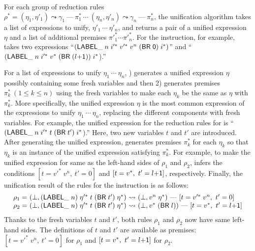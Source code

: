 For each group of reduction rules $\rho^* =
(\eta_1, \eta' _1) \leadsto \gamma_1\ \mbox{---}\ \pi_1^*\
\cdots\
(\eta_n, \eta' _n) \leadsto \gamma_n\ \mbox{---}\ \pi_n^*$,
the unification algorithm \unify takes a list of expressions to unify,
$\eta'_1\ \cdots\ \eta'_n$, and returns a pair of
a unified expression $\eta$ and a list of additional premises $\pi'^*_1 \cdots \pi'^*_n$.
For the \inblue{\ensuremath{\mathsf{br}}} instruction, for example,
\unify takes two expressions
``{$(\mathsf{LABEL\_} \; n \; i'^*\; v'^*\; v^n\; (\mathsf{BR\; 0})\; i^*)$}'' and
``{$(\mathsf{LABEL\_} \; n \; i'^*\; v^*\; (\mathsf{BR\; (} l\mathsf{+1)})\; i^*$)}.''

For a list of expressions to unify $\eta_1\ \cdots\ \eta_n$,
) generates a unified expression $\eta$ possibly containing some fresh variables
and then 2) generates premises $\pi_k^*\ (1\le k \le n)$ using the fresh variables to make
each $\eta_k$ be the same as $\eta$ with $\pi_k^*$.
More specifically, the unified expression $\eta$ is the most common expression of
the expressions to unify $\eta_1\ \cdots\ \eta_n$,
replacing the different components with fresh variables.
For example, the unified expression for the reduction rules for  is
``{$(\mathsf{LABEL\_} \; n \; i'^*\; t\; (\mathsf{BR}\; t')\; i^*$)}.''
Here, two new variables $t$ and $t'$ are introduced.
After generating the unified expression, \unify generates premises $\pi_k^*$
for each $\eta_k$ so that $\eta_k$ is an instance of the unified expression satisfying $\pi_k^*$.
For example, to make the unified expression for 
same as the left-hand sides of $\rho_1$ and $\rho_2$, \unify infers the conditions
$[t = v'^*\; v^n,\ t' = 0]$ and $[t = v^*,\ t' = l\mathsf{+1}]$, respectively.
Finally, the unification result of the rules for the  instruction is as follows:
\[
\begin{array}{l@{~}l@{~}c@{~}l}
\rho_1 = &(\bot, (\ssf{LABEL\_} \; n) \; \eta'^*\; t\; (\ssf{BR}\; t')\; \eta^*) &\leadsto&
 (\bot, v^n\; \eta^*)\ \mbox{---}\ [t = v'^*\; v^n,\ t' = 0]\\
\rho_2 = &(\bot, (\ssf{LABEL\_} \; n) \; \eta'^*\; t\; (\ssf{BR}\; t')\; \eta^*) &\leadsto&
 (\bot, v^*\; (\ssf{BR}\; l))\ \mbox{---}\ [t = v^*,\ t' = l\ssf{+1}]
\end{array}
\]
Thanks to the fresh variables $t$ and $t'$, both rules $\rho_1$ and $\rho_2$ now have
same left-hand sides. The definitions of $t$ and $t'$ are available as premises:
$[t = v'^*\; v^n,\ t' = 0]$ for $\rho_1$ and
$[t = v^*,\ t' = l\mathsf{+1}]$ for $\rho_2$.


